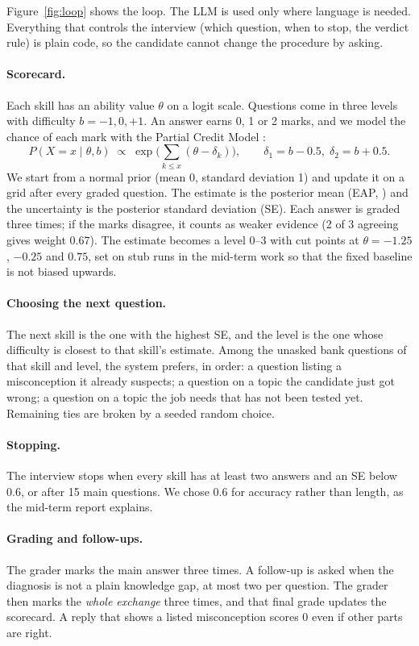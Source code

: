 \documentclass[10pt,a4paper]{article}
\begin{document}
Figure~\ref{fig:loop} shows the loop. The LLM is used only where language is needed. Everything
that controls the interview (which question, when to stop, the verdict rule) is plain code, so the
candidate cannot change the procedure by asking.

\paragraph{Scorecard.} Each skill has an ability value $\theta$ on a logit scale. Questions come in
three levels with difficulty $b = -1, 0, +1$. An answer earns 0, 1 or 2 marks, and we model the
chance of each mark with the Partial Credit Model \cite{masters1982}:
\[
  P(X = x \mid \theta, b) \;\propto\; \exp\Big(\sum_{k \le x} (\theta - \delta_k)\Big),
  \qquad \delta_1 = b - 0.5,\; \delta_2 = b + 0.5 .
\]
We start from a normal prior (mean 0, standard deviation 1) and update it on a grid after every
graded question. The estimate is the posterior mean (EAP, \cite{bock1982}) and the uncertainty is
the posterior standard deviation (SE). Each answer is graded three times; if the marks disagree, it
counts as weaker evidence (2 of 3 agreeing gives weight 0.67). The estimate becomes a level 0--3 with
cut points at $\theta = -1.25$, $-0.25$ and $0.75$, set on stub runs in the mid-term work so that
the fixed baseline is not biased upwards.

\paragraph{Choosing the next question.} The next skill is the one with the highest SE, and the
level is the one whose difficulty is closest to that skill's estimate. Among the unasked bank
questions of that skill and level, the system prefers, in order: a question listing a misconception
it already suspects; a question on a topic the candidate just got wrong; a question on a topic the
job needs that has not been tested yet. Remaining ties are broken by a seeded random choice.

\paragraph{Stopping.} The interview stops when every skill has at least two answers and an SE
below 0.6, or after 15 main questions. We chose 0.6 for accuracy rather than length, as the
mid-term report explains.

\paragraph{Grading and follow-ups.} The grader marks the main answer three times. A follow-up is
asked when the diagnosis is not a plain knowledge gap, at most two per question. The grader then
marks the \emph{whole exchange} three times, and that final grade updates the scorecard. A reply
that shows a listed misconception scores 0 even if other parts are right.
\end{document}
